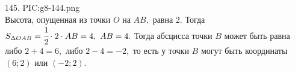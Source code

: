 145. {{PIC:g8-144.png}}\\
Высота, опущенная из точки $O$ на $AB,$ равна 2. Тогда $S_{\Delta OAB}=\cfrac{1}{2}\cdot 2 \cdot AB=4,\ AB=4.$ Тогда абсцисса точки $B$ может быть равна либо $2+4=6,$ либо $2-4=-2,$ то есть у точки $B$ могут быть координаты $(6;2)$ или $(-2;2).$\\
